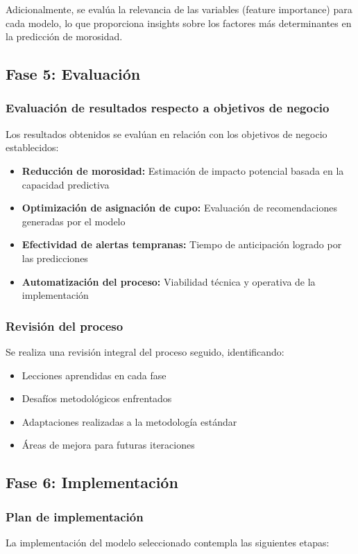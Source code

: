 Adicionalmente, se evalúa la relevancia de las variables (feature importance) para cada modelo, lo que proporciona insights sobre los factores más determinantes en la predicción de morosidad.

\subsection{Fase 5: Evaluación}
\subsubsection{Evaluación de resultados respecto a objetivos de negocio}
Los resultados obtenidos se evalúan en relación con los objetivos de negocio establecidos:

\begin{itemize}
    \item \textbf{Reducción de morosidad:} Estimación de impacto potencial basada en la capacidad predictiva
    \item \textbf{Optimización de asignación de cupo:} Evaluación de recomendaciones generadas por el modelo
    \item \textbf{Efectividad de alertas tempranas:} Tiempo de anticipación logrado por las predicciones
    \item \textbf{Automatización del proceso:} Viabilidad técnica y operativa de la implementación
\end{itemize}

\subsubsection{Revisión del proceso}
Se realiza una revisión integral del proceso seguido, identificando:

\begin{itemize}
    \item Lecciones aprendidas en cada fase
    \item Desafíos metodológicos enfrentados
    \item Adaptaciones realizadas a la metodología estándar
    \item Áreas de mejora para futuras iteraciones
\end{itemize}

\subsection{Fase 6: Implementación}
\subsubsection{Plan de implementación}
La implementación del modelo seleccionado contempla las siguientes etapas:

